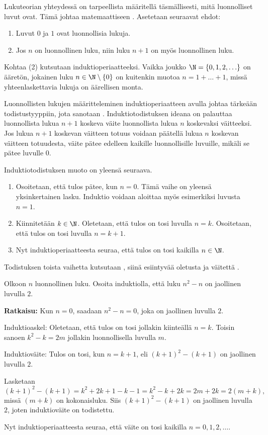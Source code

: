 Lukuteorian yhteydessä on tarpeellista määritellä täsmällisesti, mitä luonnolliset luvut ovat. Tämä johtaa matemaattiseen . Asetetaan seuraavat ehdot:
\begin{enumerate}
\item Luvut $0$ ja $1$ ovat luonnollisia lukuja.
\item Jos $n$ on luonnollinen luku, niin luku $n+1$ on myös luonnollinen luku.
\end{enumerate}
Kohtaa (2) kutsutaan induktioperiaatteeksi. Vaikka joukko
$\N = \{0,1,2,\ldots\}$
on ääretön, jokainen luku $n\in \N\setminus \{0\}$ on kuitenkin muotoa $n=1+\ldots + 1$, missä yhteenlaskettavia lukuja on äärellisen monta.

Luonnollisten lukujen määritteleminen induktioperiaatteen avulla johtaa tärkeään todistustyyppiin, jota sanotaan . Induktiotodistuksen ideana on palauttaa luonnollista lukua $n+1$ koskeva väite luonnollista lukua $n$ koskevaksi väitteeksi. Jos lukua $n+1$ koskevan väitteen totuus voidaan päätellä lukua $n$ koskevan väitteen totuudesta, väite pätee  edelleen kaikille luonnollisille luvuille, mikäli se pätee luvulle $0$. 

Induktiotodistuksen muoto on yleensä seuraava.
\begin{enumerate}
\item Osoitetaan, että tulos pätee, kun $n=0$. Tämä vaihe on yleensä yksinkertainen lasku. Induktio voidaan aloittaa myös esimerkiksi luvusta $n=1$.
\item Kiinnitetään $k\in \N$. Oletetaan, että tulos on tosi luvulla $n=k$. Osoitetaan, että tulos on tosi luvulla $n=k+1$.
\item Nyt induktioperiaatteesta seuraa, että tulos on tosi kaikilla $n\in \N$.
\end{enumerate}
Todistuksen toista vaihetta kutsutaan , siinä esiintyvää oletusta  ja väitettä .

\begin{esimerkki}
Olkoon $n$ luonnollinen luku. Osoita induktiolla, että luku $n^2-n$ on jaollinen luvulla $2$.

{\bf Ratkaisu:} 
Kun $n=0$, saadaan $n^2-n=0$, joka on jaollinen luvulla $2$.

Induktioaskel: Oletetaan, että tulos on tosi jollakin kiinteällä $n=k$. Toisin sanoen $k^2-k=2m$ jollakin luonnollisella luvulla $m$. 

Induktioväite: Tulos on tosi, kun $n=k+1$, eli $(k+1)^2-(k+1)$ on jaollinen luvulla $2$.

Lasketaan
\[
(k+1)^2-(k+1)= k^2+2k+1-k-1= k^2-k +2k=2m +2k =2(m+k),
\]
missä $(m+k)$ on kokonaisluku. Siis $(k+1)^2-(k+1)$ on jaollinen luvulla $2$, joten induktioväite on todistettu.

Nyt induktioperiaatteesta seuraa, että väite on tosi kaikilla $n=0,1,2,\ldots$.
\end{esimerkki}

